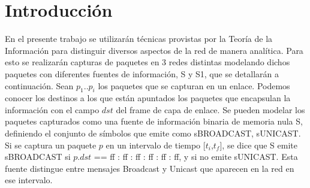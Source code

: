 \section{Introducción}
En el presente trabajo se utilizarán técnicas provistas por la Teoría de la Información para distinguir diversos aspectos de la red de manera analítica. Para esto se realizarán capturas de paquetes en 3 redes distintas modelando dichos paquetes con diferentes fuentes de información, S y S1, que se detallarán a continuación. Sean $p_1..p_i$ los paquetes que se capturan en un enlace. Podemos conocer los destinos a los que están apuntados los paquetes que encapsulan la información con el campo $dst$ del frame de capa de enlace. Se pueden modelar los paquetes capturados como una fuente de información binaria de memoria nula S, definiendo el conjunto de símbolos que emite como {sBROADCAST, sUNICAST}. Si se captura un paquete $p$ en un intervalo de tiempo [$t_i$,$t_f$], se dice que S emite sBROADCAST si $p.dst$ == ff : ff : ff : ff : ff : ff, y si no emite sUNICAST. Esta fuente distingue entre mensajes Broadcast y Unicast que aparecen en la red en ese intervalo.